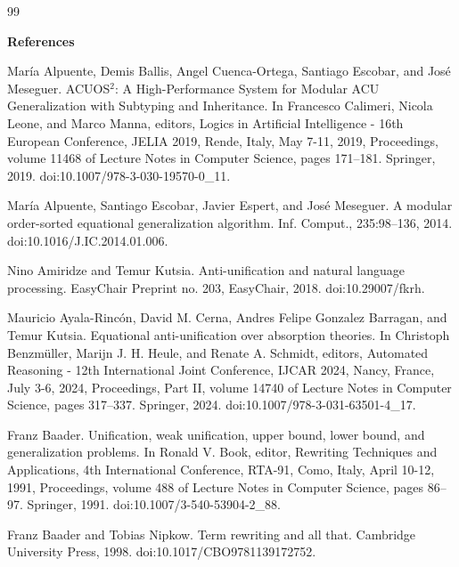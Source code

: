\documentclass[10pt,a4paper]{amsart}
\begin{document}
\begin{thebibliography}{99}

 
\par\medskip\noindent\textbf{References}\par
  
\par\noindent  [1]  María Alpuente, Demis Ballis, Angel Cuenca-Ortega, Santiago Escobar, and José Meseguer.  ACUOS${}^{\mbox{2}}$: A High-Performance System for Modular ACU Generalization with Subtyping and Inheritance.  In Francesco Calimeri, Nicola Leone, and Marco Manna, editors, Logics in Artificial Intelligence - 16th European Conference, JELIA 2019, Rende, Italy, May 7-11, 2019, Proceedings, volume 11468 of Lecture Notes in Computer Science, pages 171–181. Springer, 2019.  doi:10.1007/978-3-030-19570-0\_11.  
 
\par\noindent  [2]  María Alpuente, Santiago Escobar, Javier Espert, and José Meseguer.  A modular order-sorted equational generalization algorithm.  Inf. Comput., 235:98–136, 2014.  doi:10.1016/J.IC.2014.01.006.  
 
\par\noindent  [3]  Nino Amiridze and Temur Kutsia.  Anti-unification and natural language processing.  EasyChair Preprint no. 203, EasyChair, 2018.  doi:10.29007/fkrh.  
 
\par\noindent  [4]  Mauricio Ayala-Rincón, David M. Cerna, Andres Felipe Gonzalez Barragan, and Temur Kutsia.  Equational anti-unification over absorption theories.  In Christoph Benzmüller, Marijn J. H. Heule, and Renate A. Schmidt, editors, Automated Reasoning - 12th International Joint Conference, IJCAR 2024, Nancy, France, July 3-6, 2024, Proceedings, Part II, volume 14740 of Lecture Notes in Computer Science, pages 317–337. Springer, 2024.  doi:10.1007/978-3-031-63501-4\_17.  
 
\par\noindent  [5]  Franz Baader.  Unification, weak unification, upper bound, lower bound, and generalization problems.  In Ronald V. Book, editor, Rewriting Techniques and Applications, 4th International Conference, RTA-91, Como, Italy, April 10-12, 1991, Proceedings, volume 488 of Lecture Notes in Computer Science, pages 86–97. Springer, 1991.  doi:10.1007/3-540-53904-2\_88.  
 
\par\noindent  [6]  Franz Baader and Tobias Nipkow.  Term rewriting and all that.  Cambridge University Press, 1998.  doi:10.1017/CBO9781139172752.  
 

\end{thebibliography}
\end{document}
